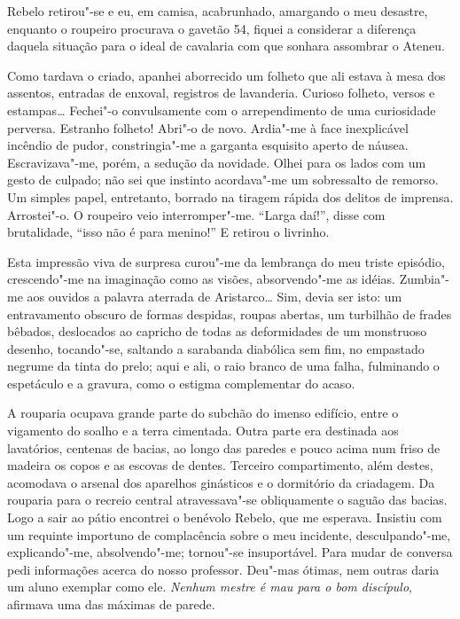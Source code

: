 Rebelo retirou"-se e eu, em camisa, acabrunhado, amargando o meu desastre,
enquanto o roupeiro procurava o gavetão 54, fiquei a considerar a
diferença daquela situação para o ideal de cavalaria com que sonhara
assombrar o Ateneu. 

Como tardava o criado, apanhei aborrecido um
folheto que ali estava à mesa dos assentos, entradas de enxoval,
registros de lavanderia. Curioso folheto, versos e estampas\ldots{}
Fechei"-o convulsamente com o arrependimento de uma curiosidade
perversa. Estranho folheto! Abri"-o de novo. Ardia"-me à face
inexplicável incêndio de pudor, constringia"-me a garganta esquisito
aperto de náusea. Escravizava"-me, porém, a sedução da novidade. Olhei
para os lados com um gesto de culpado; não sei que instinto
acordava"-me um sobressalto de remorso. Um simples papel, entretanto,
borrado na tiragem rápida dos delitos de imprensa. Arrostei"-o. O
roupeiro veio interromper"-me. ``Larga daí!'', disse com brutalidade, 
``isso não é para menino!'' E retirou o livrinho. 

Esta impressão viva de
surpresa curou"-me da lembrança do meu triste episódio, crescendo"-me
na imaginação como as visões, absorvendo"-me as idéias. Zumbia"-me
aos ouvidos a palavra aterrada de Aristarco\ldots{} Sim, devia ser isto: um
entravamento obscuro de formas despidas, roupas abertas, um turbilhão
de frades bêbados, deslocados ao capricho de todas as deformidades de
um monstruoso desenho, tocando"-se, saltando a sarabanda diabólica sem
fim, no empastado negrume da tinta do prelo; aqui e ali, o raio branco
de uma falha, fulminando o espetáculo e a gravura, como o estigma
complementar do acaso. 

A rouparia ocupava grande parte do subchão do
imenso edifício, entre o vigamento do soalho e a terra cimentada. Outra
parte era destinada aos lavatórios, centenas de bacias, ao longo das
paredes e pouco acima num friso de madeira os copos e as escovas de
dentes. Terceiro compartimento, além destes, acomodava o arsenal dos
aparelhos ginásticos e o dormitório da criadagem. Da rouparia para o
recreio central atravessava"-se obliquamente o saguão das bacias. Logo
a sair ao pátio encontrei o benévolo Rebelo, que me esperava. Insistiu
com um requinte importuno de complacência sobre o meu incidente,
desculpando"-me, explicando"-me, absolvendo"-me; tornou"-se
insuportável. Para mudar de conversa pedi informações acerca do nosso
professor. Deu"-mas ótimas, nem outras daria um aluno exemplar como
ele. \textit{Nenhum mestre é mau para o bom discípulo}, afirmava 
uma das máximas de parede. 

